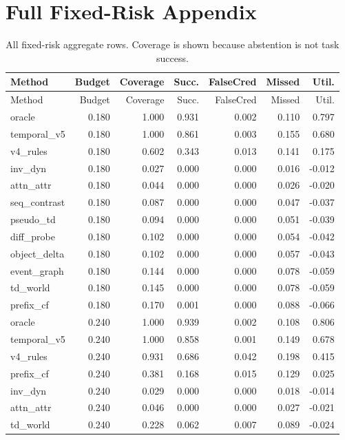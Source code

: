 \documentclass{article}
\begin{document}
\section{Full Fixed-Risk Appendix}
\begin{longtable}{@{}lrrrrrr@{}}
\caption{All fixed-risk aggregate rows. Coverage is shown because abstention is not task success.}\\
\toprule
Method & Budget & Coverage & Succ. & FalseCred & Missed & Util.\\
\midrule
\endfirsthead
\toprule
Method & Budget & Coverage & Succ. & FalseCred & Missed & Util.\\
\midrule
\endhead
oracle & 0.180 & 1.000 & 0.931 & 0.002 & 0.110 & 0.797 \\
temporal\_v5 & 0.180 & 1.000 & 0.861 & 0.003 & 0.155 & 0.680 \\
v4\_rules & 0.180 & 0.602 & 0.343 & 0.013 & 0.141 & 0.175 \\
inv\_dyn & 0.180 & 0.027 & 0.000 & 0.000 & 0.016 & -0.012 \\
attn\_attr & 0.180 & 0.044 & 0.000 & 0.000 & 0.026 & -0.020 \\
seq\_contrast & 0.180 & 0.087 & 0.000 & 0.000 & 0.047 & -0.037 \\
pseudo\_td & 0.180 & 0.094 & 0.000 & 0.000 & 0.051 & -0.039 \\
diff\_probe & 0.180 & 0.102 & 0.000 & 0.000 & 0.054 & -0.042 \\
object\_delta & 0.180 & 0.102 & 0.000 & 0.000 & 0.057 & -0.043 \\
event\_graph & 0.180 & 0.144 & 0.000 & 0.000 & 0.078 & -0.059 \\
td\_world & 0.180 & 0.145 & 0.000 & 0.000 & 0.078 & -0.059 \\
prefix\_cf & 0.180 & 0.170 & 0.001 & 0.000 & 0.088 & -0.066 \\
oracle & 0.240 & 1.000 & 0.939 & 0.002 & 0.108 & 0.806 \\
temporal\_v5 & 0.240 & 1.000 & 0.858 & 0.001 & 0.149 & 0.678 \\
v4\_rules & 0.240 & 0.931 & 0.686 & 0.042 & 0.198 & 0.415 \\
prefix\_cf & 0.240 & 0.381 & 0.168 & 0.015 & 0.129 & 0.025 \\
inv\_dyn & 0.240 & 0.029 & 0.000 & 0.000 & 0.018 & -0.014 \\
attn\_attr & 0.240 & 0.046 & 0.000 & 0.000 & 0.027 & -0.021 \\
td\_world & 0.240 & 0.228 & 0.062 & 0.007 & 0.089 & -0.024 \\

\end{longtable}
\end{document}

